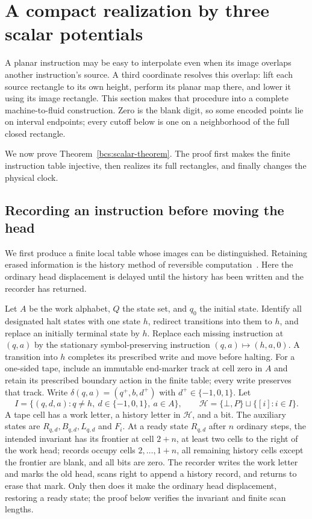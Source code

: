 \section{A compact realization by three scalar potentials}\label{bcs:scalar-section}
A planar instruction may be easy to interpolate even when its image overlaps another instruction's source. A third coordinate resolves this overlap: lift each source rectangle to its own height, perform its planar map there, and lower it using its image rectangle. This section makes that procedure into a complete machine-to-fluid construction. Zero is the blank digit, so some encoded points lie on interval endpoints; every cutoff below is one on a neighborhood of the full closed rectangle.

We now prove Theorem~\ref{bcs:scalar-theorem}. The proof first makes the finite instruction table injective, then realizes its full rectangles, and finally changes the physical clock.


\subsection{Recording an instruction before moving the head}
We first produce a finite local table whose images can be distinguished. Retaining erased information is the history method of reversible computation~\cite{Bennett1973}. Here the ordinary head displacement is delayed until the history has been written and the recorder has returned.

Let $A$ be the work alphabet, $Q$ the state set, and $q_0$ the initial state. Identify all designated halt states with one state $h$, redirect transitions into them to $h$, and replace an initially terminal state by $h$. Replace each missing instruction at $(q,a)$ by the stationary symbol-preserving instruction $(q,a)\mapsto(h,a,0)$. A transition into $h$ completes its prescribed write and move before halting. For a one-sided tape, include an immutable end-marker track at cell zero in $A$ and retain its prescribed boundary action in the finite table; every write preserves that track. Write
$\delta(q,a)=(q^+,b,d^+)$ with $d^+\in\{-1,0,1\}$. Let
\[
 I=\{(q,d,a):q\ne h,\ d\in\{-1,0,1\},\ a\in A\},\qquad
 \mathcal H=\{\bot,P\}\sqcup\{[i]:i\in I\}.
\]
A tape cell has a work letter, a history letter in $\mathcal H$, and a bit. The auxiliary states are $R_{q,d},B_{q,d},L_{q,d}$ and $F_i$. At a ready state $R_{q,d}$ after $n$ ordinary steps, the intended invariant has its frontier at cell $2+n$, at least two cells to the right of the work head; records occupy cells $2,\ldots,1+n$, all remaining history cells except the frontier are blank, and all bits are zero. The recorder writes the work letter and marks the old head, scans right to append a history record, and returns to erase that mark. Only then does it make the ordinary head displacement, restoring a ready state; the proof below verifies the invariant and finite scan lengths.

